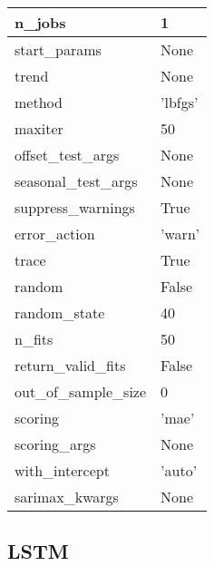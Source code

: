 \begin{table}[H]
\begin{tabular}{|l|l|}
    n\_jobs                & 1       \\ \hline
    start\_params          & None    \\ \hline
    trend                  & None    \\ \hline
    method                 & 'lbfgs' \\ \hline
    maxiter                & 50      \\ \hline
    offset\_test\_args     & None    \\ \hline
    seasonal\_test\_args   & None    \\ \hline
    suppress\_warnings     & True    \\ \hline
    error\_action          & 'warn'  \\ \hline
    trace                  & True    \\ \hline
    random                 & False   \\ \hline
    random\_state          & 40      \\ \hline
    n\_fits                & 50      \\ \hline
    return\_valid\_fits    & False   \\ \hline
    out\_of\_sample\_size  & 0       \\ \hline
    scoring                & 'mae'   \\ \hline
    scoring\_args          & None    \\ \hline
    with\_intercept        & 'auto'  \\ \hline
    sarimax\_kwargs        & None    \\ \hline
  \end{tabular}
\end{table}


\subsection{LSTM}

